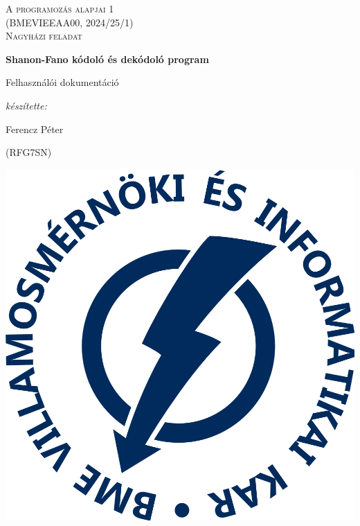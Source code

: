 \let\mypdfximage\pdfximage\def\pdfximage{\immediate\mypdfximage}\documentclass[twoside]{book}
\newcommand{\+}{\discretionary{\mbox{\scriptsize$\hookleftarrow$}}{}{}}
\begin{document}
\raggedbottom

\hypersetup{
  pageanchor=false,
  bookmarksnumbered=true,
  pdfencoding=unicode
  }


\graphicspath{ {../res/} }

\begin{titlepage}
    \centering
    \vspace{1cm}
    {\Large \textsc{A programozás alapjai 1\\(BMEVIEEAA00, 2024/25/1)\\  Nagyházi feladat}\par}
    \vspace{1.5cm}  
    {\huge\bfseries Shanon-Fano kódoló és dekódoló program\par}
    {\huge Felhasználói dokumentáció\par}
    \vspace{2cm}
    {\Large\itshape készítette: \par Ferencz Péter\par (RFG7SN)}
    \vfill
    \includegraphics[totalheight=3cm]{VIK.png}\par

\end{titlepage}
\end{document}
